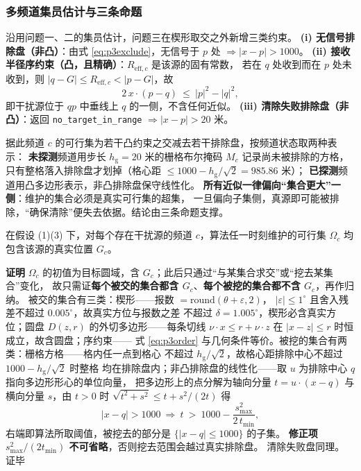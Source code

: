 \documentclass[withoutpreface, bwprint]{cumcmthesis}
\renewenvironment{proof}{\par\noindent\textbf{证明}\quad}{\hfill 证毕\par\medskip}
\begin{document}
\subsubsection{多频道集员估计与三条命题}
\label{sssec:p3belief}

沿用问题一、二的集员估计，问题三在楔形取交之外新增三类约束。
\textbf{(i) 无信号排除盘（非凸）}：由式 \eqref{eq:p3exclude}，无信号于 $p$ 处
$\Rightarrow\lvert x-p\rvert>1000$。
\textbf{(ii) 接收半径序约束（凸，且精确）}：$R_{\mathrm{eff},c}$ 是该源的固有常数，
若在 $q$ 处收到而在 $p$ 处未收到，则 $\lvert q-G\rvert\le R_{\mathrm{eff},c}<\lvert p-G\rvert$，故
\begin{equation}
  \label{eq:p3order}
  2\,x\cdot(p-q)\ \le\ \lvert p\rvert^{2}-\lvert q\rvert^{2},
\end{equation}
即干扰源位于 $qp$ 中垂线上 $q$ 的一侧，不含任何近似。
\textbf{(iii) 清除失败排除盘（非凸）}：返回 \verb|no_target_in_range|
$\Rightarrow\lvert x-p\rvert>20$ 米。

据此频道 $c$ 的可行集为若干凸约束之交减去若干排除盘，按频道状态取两种表示：
\textbf{未探测}频道用步长 $h_{\mathrm{g}}=20$ 米的栅格布尔掩码 $M_c$ 记录尚未被排除的方格，
只有整格落入排除盘才划掉（格心距 $\le 1000-h_{\mathrm{g}}/\sqrt2=985.86$ 米）；
\textbf{已探测}频道用凸多边形表示，非凸排除盘保守线性化。
\textbf{所有近似一律偏向“集合更大”一侧}：维护的集合必须是真实可行集的超集，
一旦偏向子集侧，真源即可能被排除，“确保清除”便失去依据。结论由三条命题支撑。

\begin{theorem}[集员估计的超集性]
\label{thm:p3contain}
在假设 (1)(3) 下，对每个存在干扰源的频道 $c$，算法任一时刻维护的可行集
$\Omega_c$ 均包含该源的真实位置 $G_c$。
\end{theorem}

\begin{proof}
$\Omega_c$ 的初值为目标圆域，含 $G_c$；此后只通过“与某集合求交”或“挖去某集合”变化，
故只需证\textbf{每个被交的集合都含 $G_c$}、\textbf{每个被挖的集合都不含 $G_c$}，再作归纳。
被交的集合有三类：楔形——报数 $=\mathrm{round}(\theta+\varepsilon,2)$，
$\lvert\varepsilon\rvert\le 1^\circ$ 且舍入残差不超过 $0.005^\circ$，故真实方位与报数之差
不超过 $\delta=1.005^\circ$，楔形必含真实方位；圆盘 $D(z,r)$ 的外切多边形——每条切线
$\nu\cdot x\le r+\nu\cdot z$ 在 $\lvert x-z\rvert\le r$ 时恒成立，故含圆盘；序约束——
式 \eqref{eq:p3order} 与几何条件等价。被挖的集合有两类：栅格方格——格内任一点到格心
不超过 $h_{\mathrm{g}}/\sqrt2$，故格心距排除中心不超过 $1000-h_{\mathrm{g}}/\sqrt2$ 时整格
均在排除盘内；非凸排除盘的线性化——取 $u$ 为排除中心 $q$ 指向多边形形心的单位向量，
把多边形上的点分解为轴向分量 $t=u\cdot(x-q)$ 与横向分量 $s$，由 $t>0$ 时
$\sqrt{t^{2}+s^{2}}\le t+s^{2}/(2t)$ 得
\begin{equation}
  \label{eq:p3lin}
  \lvert x-q\rvert>1000\ \Longrightarrow\
  t\ >\ 1000-\frac{s_{\max}^{2}}{2\,t_{\min}},
\end{equation}
右端即算法所取阈值，被挖去的部分是 $\{\lvert x-q\rvert\le 1000\}$ 的子集。
\textbf{修正项 $s_{\max}^{2}/(2t_{\min})$ 不可省略}，否则挖去范围会越过真实排除盘。
清除失败盘同理。
\end{proof}
\end{document}
